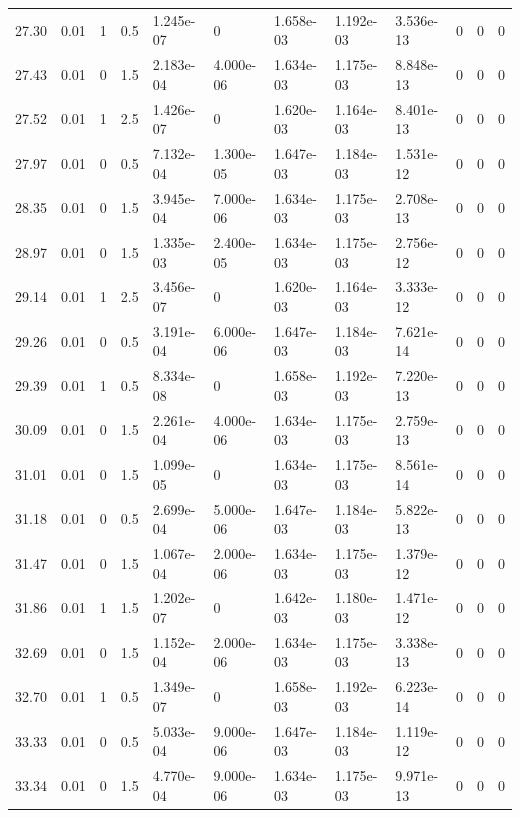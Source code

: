 \documentclass[preview]{standalone}
\begin{document}
{{{\begin{tabular}{L{1.2cm}C{1.2cm} C{0.3cm}C{0.5cm} C{1.4cm}C{1.4cm} C{1.4cm}C{1.4cm} C{1.6cm}C{1.6cm} C{1.6cm}C{1.6cm}}
  27.30  &  0.01  & 1     & 0.5 &  1.245e-07  & 0  &  1.658e-03&   1.192e-03& 3.536e-13 & 0   &  0 & 0  \\ 
  27.43  &  0.01  & 0     & 1.5 &  2.183e-04  & 4.000e-06  &  1.634e-03&   1.175e-03& 8.848e-13 & 0   &  0 & 0  \\ 
  27.52  &  0.01  & 1     & 2.5 &  1.426e-07  & 0  &  1.620e-03&   1.164e-03& 8.401e-13 & 0   &  0 & 0  \\ 
  27.97  &  0.01  & 0     & 0.5 &  7.132e-04  & 1.300e-05  &  1.647e-03&   1.184e-03& 1.531e-12 & 0   &  0 & 0  \\ 
  28.35  &  0.01  & 0     & 1.5 &  3.945e-04  & 7.000e-06  &  1.634e-03&   1.175e-03& 2.708e-13 & 0   &  0 & 0  \\ 
  28.97  &  0.01  & 0     & 1.5 &  1.335e-03  & 2.400e-05  &  1.634e-03&   1.175e-03& 2.756e-12 & 0   &  0 & 0  \\ 
  29.14  &  0.01  & 1     & 2.5 &  3.456e-07  & 0  &  1.620e-03&   1.164e-03& 3.333e-12 & 0   &  0 & 0  \\ 
  29.26  &  0.01  & 0     & 0.5 &  3.191e-04  & 6.000e-06  &  1.647e-03&   1.184e-03& 7.621e-14 & 0   &  0 & 0  \\ 
  29.39  &  0.01  & 1     & 0.5 &  8.334e-08  & 0  &  1.658e-03&   1.192e-03& 7.220e-13 & 0   &  0 & 0  \\ 
  30.09  &  0.01  & 0     & 1.5 &  2.261e-04  & 4.000e-06  &  1.634e-03&   1.175e-03& 2.759e-13 & 0   &  0 & 0  \\ 
  31.01  &  0.01  & 0     & 1.5 &  1.099e-05  & 0  &  1.634e-03&   1.175e-03& 8.561e-14 & 0   &  0 & 0  \\ 
  31.18  &  0.01  & 0     & 0.5 &  2.699e-04  & 5.000e-06  &  1.647e-03&   1.184e-03& 5.822e-13 & 0   &  0 & 0  \\ 
  31.47  &  0.01  & 0     & 1.5 &  1.067e-04  & 2.000e-06  &  1.634e-03&   1.175e-03& 1.379e-12 & 0   &  0 & 0  \\ 
  31.86  &  0.01  & 1     & 1.5 &  1.202e-07  & 0  &  1.642e-03&   1.180e-03& 1.471e-12 & 0   &  0 & 0  \\ 
  32.69  &  0.01  & 0     & 1.5 &  1.152e-04  & 2.000e-06  &  1.634e-03&   1.175e-03& 3.338e-13 & 0   &  0 & 0  \\ 
  32.70  &  0.01  & 1     & 0.5 &  1.349e-07  & 0  &  1.658e-03&   1.192e-03& 6.223e-14 & 0   &  0 & 0  \\ 
  33.33  &  0.01  & 0     & 0.5 &  5.033e-04  & 9.000e-06  &  1.647e-03&   1.184e-03& 1.119e-12 & 0   &  0 & 0  \\ 
  33.34  &  0.01  & 0     & 1.5 &  4.770e-04  & 9.000e-06  &  1.634e-03&   1.175e-03& 9.971e-13 & 0   &  0 & 0  \\ 

\end{tabular}}}}
\end{document}
